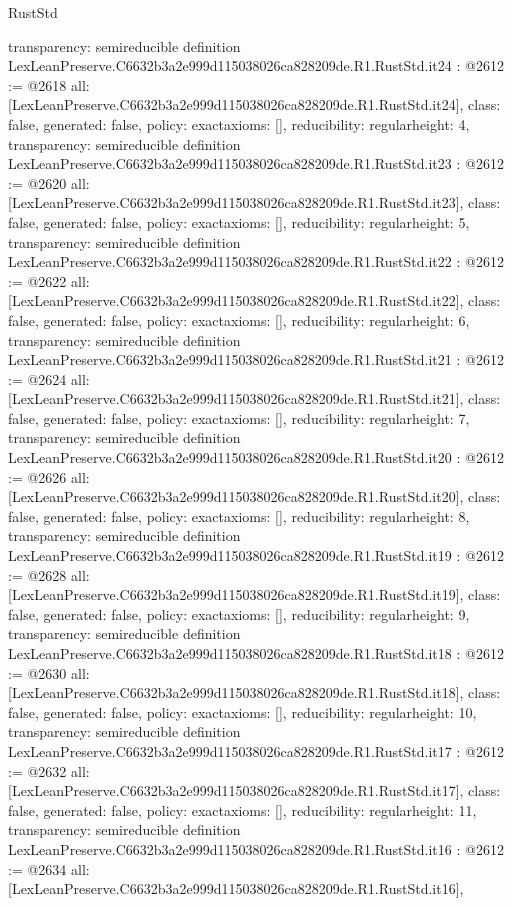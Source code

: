 \begin{lexlean}{RustStd}
\begin{coremodule}
{  transparency: semireducible
}
definition LexLeanPreserve.C6632b3a2e999d115038026ca828209de.R1.RustStd.it24 : @2612 := @2618 {
  all: [LexLeanPreserve.C6632b3a2e999d115038026ca828209de.R1.RustStd.it24],
  class: false,
  generated: false,
  policy: exact{axioms: []},
  reducibility: regular{height: 4},
  transparency: semireducible
}
definition LexLeanPreserve.C6632b3a2e999d115038026ca828209de.R1.RustStd.it23 : @2612 := @2620 {
  all: [LexLeanPreserve.C6632b3a2e999d115038026ca828209de.R1.RustStd.it23],
  class: false,
  generated: false,
  policy: exact{axioms: []},
  reducibility: regular{height: 5},
  transparency: semireducible
}
definition LexLeanPreserve.C6632b3a2e999d115038026ca828209de.R1.RustStd.it22 : @2612 := @2622 {
  all: [LexLeanPreserve.C6632b3a2e999d115038026ca828209de.R1.RustStd.it22],
  class: false,
  generated: false,
  policy: exact{axioms: []},
  reducibility: regular{height: 6},
  transparency: semireducible
}
definition LexLeanPreserve.C6632b3a2e999d115038026ca828209de.R1.RustStd.it21 : @2612 := @2624 {
  all: [LexLeanPreserve.C6632b3a2e999d115038026ca828209de.R1.RustStd.it21],
  class: false,
  generated: false,
  policy: exact{axioms: []},
  reducibility: regular{height: 7},
  transparency: semireducible
}
definition LexLeanPreserve.C6632b3a2e999d115038026ca828209de.R1.RustStd.it20 : @2612 := @2626 {
  all: [LexLeanPreserve.C6632b3a2e999d115038026ca828209de.R1.RustStd.it20],
  class: false,
  generated: false,
  policy: exact{axioms: []},
  reducibility: regular{height: 8},
  transparency: semireducible
}
definition LexLeanPreserve.C6632b3a2e999d115038026ca828209de.R1.RustStd.it19 : @2612 := @2628 {
  all: [LexLeanPreserve.C6632b3a2e999d115038026ca828209de.R1.RustStd.it19],
  class: false,
  generated: false,
  policy: exact{axioms: []},
  reducibility: regular{height: 9},
  transparency: semireducible
}
definition LexLeanPreserve.C6632b3a2e999d115038026ca828209de.R1.RustStd.it18 : @2612 := @2630 {
  all: [LexLeanPreserve.C6632b3a2e999d115038026ca828209de.R1.RustStd.it18],
  class: false,
  generated: false,
  policy: exact{axioms: []},
  reducibility: regular{height: 10},
  transparency: semireducible
}
definition LexLeanPreserve.C6632b3a2e999d115038026ca828209de.R1.RustStd.it17 : @2612 := @2632 {
  all: [LexLeanPreserve.C6632b3a2e999d115038026ca828209de.R1.RustStd.it17],
  class: false,
  generated: false,
  policy: exact{axioms: []},
  reducibility: regular{height: 11},
  transparency: semireducible
}
definition LexLeanPreserve.C6632b3a2e999d115038026ca828209de.R1.RustStd.it16 : @2612 := @2634 {
  all: [LexLeanPreserve.C6632b3a2e999d115038026ca828209de.R1.RustStd.it16],
}
\end{coremodule}
\end{lexlean}
